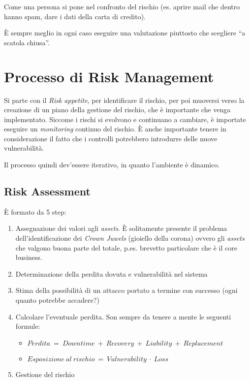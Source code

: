 Come una persona si pone nel confronto del rischio (es. aprire mail che dentro
hanno spam, dare i dati della carta di credito).

È sempre meglio in ogni caso eseguire una valutazione piuttosto che scegliere
``a scatola chiusa''.


\section{Processo di Risk Management}

Si parte con il \textit{Risk appetite}, per identificare il rischio, per poi
muoversi verso la creazione di un piano della gestione del rischio, che è
importante che venga implementato. Siccome i rischi si evolvono e continuano a
cambiare, è importate eseguire un \textit{monitoring} continuo del rischio. È
anche importante tenere in considerazione il fatto che i controlli potrebbero
introdurre delle nuove vulnerabilità.

Il processo quindi dev'essere iterativo, in quanto l'ambiente è dinamico.


\subsection{Risk Assessment}

\`E formato da 5 step:
\begin{enumerate}
 \item Assegnazione dei valori agli \textit{assets}. \`E solitamente presente
il problema dell'identificazione dei \textit{Crown Juwels} (gioiello della
corona) ovvero gli \textit{assets} che valgono buona parte del totale, p.es.
brevetto particolare che è il core business.
 \item Determinazione della perdita dovuta e vulnerabilità nel sistema
 \item Stima della possibilit\`a di un attacco portato a termine con successo
(ogni quanto potrebbe accadere?)
 \item Calcolare l'eventuale perdita. Son sempre da tenere a mente le seguenti
formule:
 \begin{itemize}
  \item $Perdita\ =\ Downtime\ +\ Recovery\ +\ Liability\ +\ Replacement$
  \item $Esposizione\ al\ rischio\ =\ Vulnerability\ \cdot\ Loss$
 \end{itemize}

 \item Gestione del rischio
\end{enumerate}

